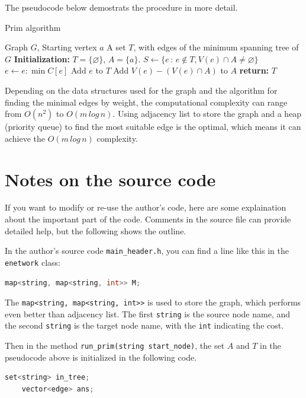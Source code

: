 \documentclass[cn,black,12pt,normal]{elegantnote}
\begin{document}
The pseudocode below demostrats the procedure in more detail.
\begin{algorithm}[H]
    \caption{Prim algorithm}
    \label{alg1}
    \begin{algorithmic}
        \REQUIRE Graph $G$, Starting vertex $a$
        \ENSURE A set $T$, with edges of the minimum spanning tree of $G$
        \STATE \textbf{Initialization:} $T=\{ \varnothing  \}$, $A = \{a\}$.
        \STATE $S \gets \{ e\,:\, e \notin T, V(e) \cap A \neq \varnothing \}$
        \STATE $e \gets e:\min{C[e]}$
        \STATE Add $e$ to $T$
        \STATE Add $V(e) - (V(e) \cap A)$ to $A$
        \ENDWHILE
        \STATE \textbf{return:} $T$
    \end{algorithmic}
\end{algorithm}

Depending on the data structures used for the graph and the algorithm for finding the minimal edges by weight, the computational complexity can range from $O(n^2)$ to $O(m\, log\, n)$. Using adjacency list to store the graph and a heap (priority queue) to find the most suitable edge is the optimal, which means it can achieve the $O(m\, log\, n)$ complexity.

\section{Notes on the source code}

If you want to modify or re-use the author's code, here are some explaination about the important part of the code. Comments in the source file can provide detailed help, but the following shows the outline.

In the author's source code \lstinline{main_header.h}, you can find a line like this in the \lstinline{enetwork} class:
\begin{lstlisting}[language = C++]
map<string, map<string, int>> M;
\end{lstlisting}
The \lstinline{map<string, map<string, int>>} is used to store the graph, which performs even better than adjacency list. The first \lstinline{string} is the source node name, and the second \lstinline{string} is the target node name, with the \lstinline{int} indicating the cost.

Then in the method \lstinline{run_prim(string start_node)}, the set $A$ and $T$ in the pseudocode above is initialized in the following code.
\begin{lstlisting}[language = C++]
    set<string> in_tree;
    vector<edge> ans;
\end{lstlisting}
\end{document}
